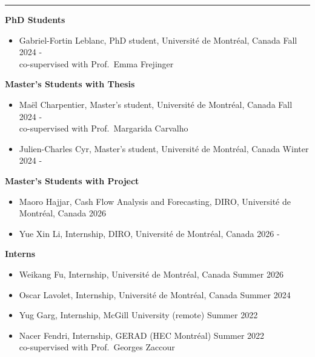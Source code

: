 \documentclass[12pt]{article}
\renewcommand{\section}[1]{
\vspace{0.25em}
\noindent{\normalfont\large\bfseries\color{black} #1}\par
\vspace{-0.24em}
\noindent\textcolor{black}{\rule{0.55\textwidth}{1.1pt}}
\vspace{0.48em}
}
\newenvironment{midlist}[1][\enskip\textbullet]%
        {\begin{itemize}[#1,leftmargin=*,parsep=0pt,itemsep=4pt,topsep=2pt,partopsep=0pt]}
        {\end{itemize}}
\begin{document}
\section{Supervision}
\vspace{-3mm}

\textbf{PhD Students}
\begin{midlist}
\item Gabriel-Fortin Leblanc, PhD student, Université de Montréal, Canada \hfill{Fall 2024 -}\\
co-supervised with Prof.~Emma Frejinger
\end{midlist}
\vspace{2mm}
\textbf{Master's Students with Thesis}
\begin{midlist}
\item Maël Charpentier, Master's student, Université de Montréal, Canada \hfill{Fall 2024 -}\\
co-supervised with Prof.~Margarida Carvalho
\item Julien-Charles Cyr, Master's student, Université de Montréal, Canada \hfill{Winter 2024 -}
\end{midlist}
\vspace{2mm}
\textbf{Master's Students with Project}
\begin{midlist}
        \item Maoro Hajjar, Cash Flow Analysis and Forecasting, DIRO, Université de Montréal, Canada \hfill{2026}
\item Yue Xin Li, Internship, DIRO, Université de Montréal, Canada \hfill{2026 -}
\end{midlist}
\vspace{2mm}
\textbf{Interns}
\begin{midlist}
\item Weikang Fu, Internship, Université de Montréal, Canada \hfill{Summer 2026}
\item Oscar Lavolet, Internship,  Université de Montréal, Canada \hfill{Summer 2024}
\item Yug Garg, Internship, McGill University (remote) \hfill{Summer 2022}
\item Nacer Fendri,  Internship, GERAD (HEC Montréal) \hfill{Summer 2022}\\
co-supervised with Prof.~Georges Zaccour
\end{midlist}
\end{document}
